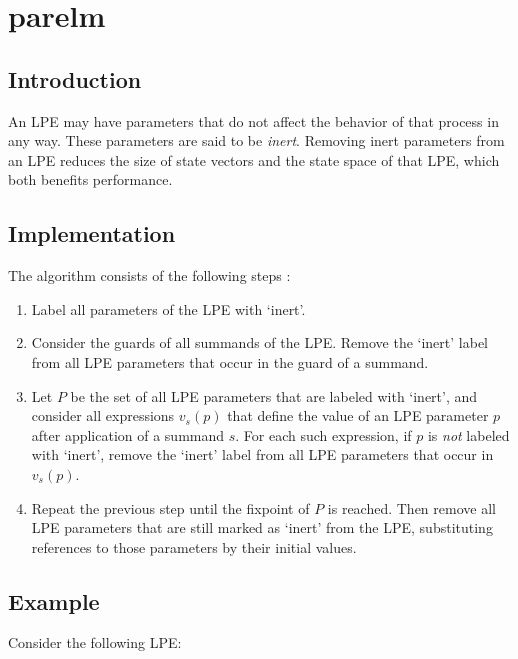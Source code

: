 \chapter{parelm}

\section{Introduction}

An LPE may have parameters that do not affect the behavior of that process in any way.
These parameters are said to be \emph{inert}.
Removing inert parameters from an LPE reduces the size of state vectors and the state space of that LPE, which both benefits performance.

\section{Implementation}

The algorithm consists of the following steps \cite{groote2001computer}:

\begin{enumerate}

\item Label all parameters of the LPE with `inert'.

\item Consider the guards of all summands of the LPE.
Remove the `inert' label from all LPE parameters that occur in the guard of a summand.

\item Let $P$ be the set of all LPE parameters that are labeled with `inert', and consider all expressions $v_s(p)$ that define the value of an LPE parameter $p$ after application of a summand $s$.
For each such expression, if $p$ is \emph{not} labeled with `inert', remove the `inert' label from all LPE parameters that occur in $v_s(p)$.

\item Repeat the previous step until the fixpoint of $P$ is reached.
Then remove all LPE parameters that are still marked as `inert' from the LPE, substituting references to those parameters by their initial values.

\end{enumerate}

\clearpage
\section{Example}

Consider the following LPE:

